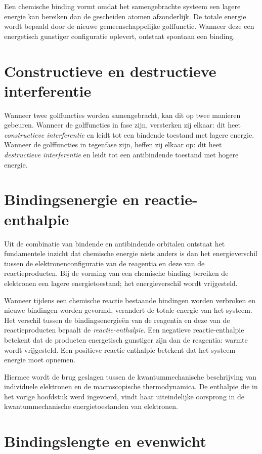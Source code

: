 Een chemische binding vormt omdat het samengebrachte systeem een lagere energie kan bereiken dan de gescheiden atomen afzonderlijk. De totale energie wordt bepaald door de nieuwe gemeenschappelijke golffunctie. Wanneer deze een energetisch gunstiger configuratie oplevert, ontstaat spontaan een binding.

\section{Constructieve en destructieve interferentie}

Wanneer twee golffuncties worden samengebracht, kan dit op twee manieren gebeuren. Wanneer de golffuncties in fase zijn, versterken zij elkaar: dit heet \emph{constructieve interferentie} en leidt tot een bindende toestand met lagere energie. Wanneer de golffuncties in tegenfase zijn, heffen zij elkaar op: dit heet \emph{destructieve interferentie} en leidt tot een antibindende toestand met hogere energie.

\section{Bindingsenergie en reactie-enthalpie}

Uit de combinatie van bindende en antibindende orbitalen ontstaat het fundamentele inzicht dat chemische energie niets anders is dan het energieverschil tussen de elektronenconfiguratie van de reagentia en deze van de reactieproducten. Bij de vorming van een chemische binding bereiken de elektronen een lagere energietoestand; het energieverschil wordt vrijgesteld.

Wanneer tijdens een chemische reactie bestaande bindingen worden verbroken en nieuwe bindingen worden gevormd, verandert de totale energie van het systeem. Het verschil tussen de bindingsenergie\"en van de reagentia en deze van de reactieproducten bepaalt de \emph{reactie-enthalpie}. Een negatieve reactie-enthalpie betekent dat de producten energetisch gunstiger zijn dan de reagentia: warmte wordt vrijgesteld. Een positieve reactie-enthalpie betekent dat het systeem energie moet opnemen.

Hiermee wordt de brug geslagen tussen de kwantummechanische beschrijving van individuele elektronen en de macroscopische thermodynamica. De enthalpie die in het vorige hoofdstuk werd ingevoerd, vindt haar uiteindelijke oorsprong in de kwantummechanische energietoestanden van elektronen.

\section{Bindingslengte en evenwicht}

